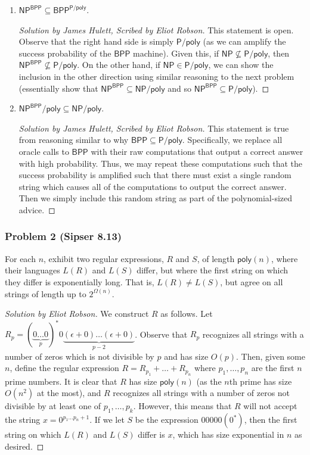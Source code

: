 \documentclass{article}
\newenvironment{solution}[1]{\begin{proof}[Solution by #1]}{\end{proof}}
\newenvironment{scribed}[2]{\begin{proof}[Solution by #1, Scribed by #2]}{\end{proof}}
\newcommand{\NP}{\mathsf{NP}}
\newcommand{\Pe}{\mathsf{P}}
\newcommand{\poly}{\mathsf{poly}}
\newcommand{\BPP}{\mathsf{BPP}}
\begin{document}
\begin{enumerate}
    \item \(\NP^{\BPP} \subseteq \BPP^{\Pe / \poly}\).
    
    \begin{scribed}{James Hulett}{Eliot Robson}
    	This statement is open. Observe that the right hand side is simply \(\Pe / \poly\) (as we can amplify the success probability of the \(\BPP\) machine). Given this, if \(\NP \not\subseteq \Pe / \poly\), then \(\NP^{\BPP} \not\subseteq \Pe / \poly\). On the other hand, if \(\NP \in \Pe / \poly\), we can show the inclusion in the other direction using similar reasoning to the next problem (essentially show that \(\NP^{\BPP} \subseteq \NP / \poly\) and so \(\NP^{\BPP} \subseteq \Pe / \poly\)).
    \end{scribed}
    
    \item \(\NP^{\BPP} / \poly \subseteq \NP / \poly\).
    
    \begin{scribed}{James Hulett}{Eliot Robson}
        This statement is true from reasoning similar to why \(\BPP \subseteq \Pe / \poly\). Specifically, we replace all oracle calls to \(\BPP\) with their raw computations that output a correct answer with high probability. Thus, we may repeat these computations such that the success probability is amplified such that there must exist a single random string which causes all of the computations to output the correct answer. Then we simply include this random string as part of the polynomial-sized advice.
    \end{scribed}
\end{enumerate}


\subsubsection{Problem 2 (Sipser 8.13)}
For each \(n\), exhibit two regular expressions, \(R\) and \(S\), of length \(\poly(n)\), where their languages \(L(R)\) and \(L(S)\) differ, but where the first string on which they differ is exponentially long. That is, \(L(R) \neq L(S)\), but agree on all strings of length up to \(2^{\Omega(n)}\).

\begin{solution}{Eliot Robson}
	We construct \(R\) as follows. Let \(R_p = (\underbrace{0 \dots 0}_{p})^* 0 \underbrace{(\epsilon + 0) \dots (\epsilon + 0)}_{p-2}\). Observe that \(R_p\) recognizes all strings with a number of zeros which is not divisible by \(p\) and has size \(O(p)\). Then, given some \(n\), define the regular expression \(R = R_{p_1} + \dots + R_{p_n}\) where \(p_1, \dots, p_n\) are the first \(n\) prime numbers. It is clear that \(R\) has size \(\poly(n)\) (as the \(n\)th prime has size \(O(n^2)\) at the most), and \(R\) recognizes all strings with a number of zeros not divisible by at least one of \(p_1, \dots, p_k\). However, this means that \(R\) will not accept the string \(x = 0^{p_1 \dots p_n + 1}\). If we let \(S\) be the expression \(00000(0^*)\), then the first string on which \(L(R)\) and \(L(S)\) differ is \(x\), which has size exponential in \(n\) as desired.
\end{solution}
\end{document}
